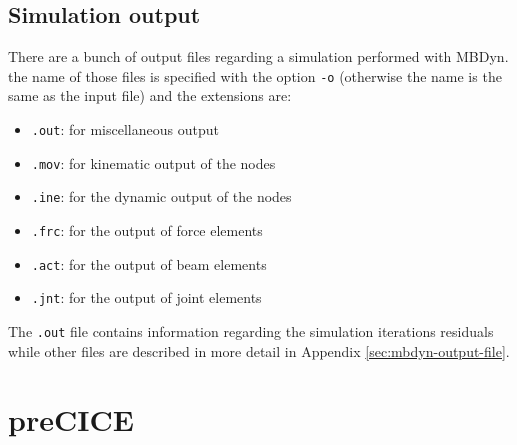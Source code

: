 \subsection{Simulation output}
\label{sec:mbd-output}

There are a bunch of output files regarding a simulation performed with MBDyn. the name of those files is specified with the option \texttt{-o} (otherwise the name is the same as the input file) and the extensions are:

\begin{itemize}
    \item \texttt{.out}: for miscellaneous output
    \item \texttt{.mov}: for kinematic output of the nodes
    \item \texttt{.ine}: for the dynamic output of the nodes
    \item \texttt{.frc}: for the output of force elements
    \item \texttt{.act}: for the output of beam elements
    \item \texttt{.jnt}: for the output of joint elements
\end{itemize}

The \texttt{.out} file contains information regarding the simulation iterations residuals while other files are described in more detail in Appendix \ref{sec:mbdyn-output-file}.



%
%
%



\section{preCICE}
\label{sec:precice}

